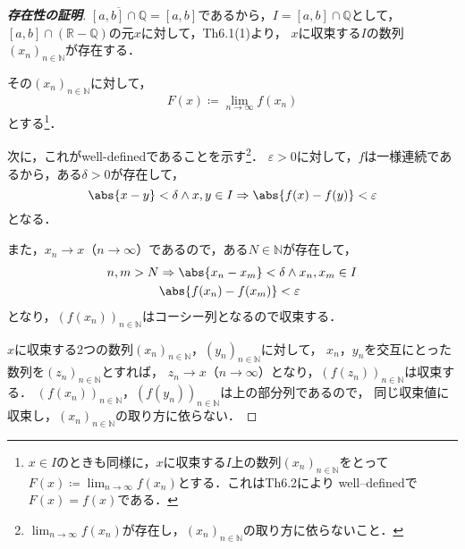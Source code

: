 \documentclass[a4paper,10pt,fleqn]{ltjsarticle}
\begin{document}
\begin{tleftbar}
    \begin{proof}[\textup{\textbf{存在性の証明}}]
        $\overline{[a,b] \cap \mathbb{Q}}=[a,b]$であるから，$I=[a,b] \cap \mathbb{Q}$として，
        $[a,b] \cap (\mathbb{R}-\mathbb{Q})$の元$x$に対して，Th6.1(1)より，
        $x$に収束する$I$の数列$(x_n)_{n \in \mathbb{N}}$が存在する．

        その$(x_n)_{n \in \mathbb{N}}$に対して，
        \[
            F(x)\coloneqq \lim_{n \to \infty} f(x_n)
        \]
        とする\footnote{$x \in I$のときも同様に，$x$に収束する$I$上の数列$(x_n)_{n \in \mathbb{N}}$をとって$F(x)\coloneqq \lim_{n \to \infty} f(x_n)$とする．これはTh6.2により well--definedで$F(x)=f(x)$である．}．

        次に，これがwell-definedであることを示す\footnote{$\lim_{n \to \infty} f(x_n)$が存在し，$(x_n)_{n \in \mathbb{N}}$の取り方に依らないこと．}．
        $\varepsilon >0$に対して，$f$は一様連続であるから，ある$\delta >0$が存在して，
        \[
            \abs{x-y}<\delta \land x,y \in I \Rightarrow \abs{f(x)-f(y)}<\varepsilon
        \]
        となる．

        また，$x_n \to x$（$n \to \infty$）であるので，ある$N \in \mathbb{N}$が存在して，
        \begin{align*}
            n, m > N & \Rightarrow \abs{x_n-x_m}<\delta \land x_n,x_m \in I \\
                     & \abs{f(x_n)-f(x_m)}<\varepsilon
        \end{align*}
        となり，$(f(x_n))_{n \in \mathbb{N}}$はコーシー列となるので収束する．

        $x$に収束する2つの数列$(x_n)_{n \in \mathbb{N}}$，$(y_n)_{n \in \mathbb{N}}$に対して，
        $x_n$，$y_n$を交互にとった数列を$(z_n)_{n \in \mathbb{N}}$とすれば，
        $z_n \to x$（$n \to \infty$）となり，$(f(z_n))_{n \in \mathbb{N}}$は収束する．
        $(f(x_n))_{n \in \mathbb{N}}$，$(f(y_n))_{n \in \mathbb{N}}$は上の部分列であるので，
        同じ収束値に収束し，$(x_n)_{n \in \mathbb{N}}$の取り方に依らない．
    \end{proof}
\end{tleftbar}
\end{document}
